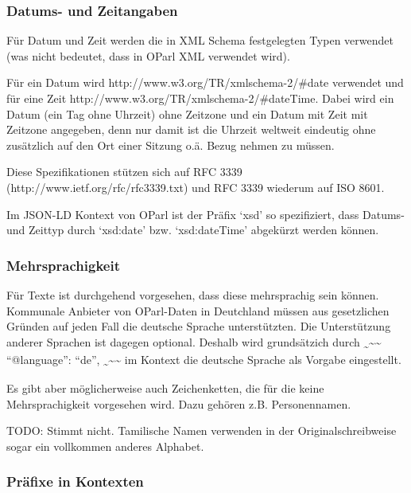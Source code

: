 \documentclass[,a4paper]{article}
\begin{document}
\subsubsection{Datums- und Zeitangaben}\label{datums--und-zeitangaben}

Für Datum und Zeit werden die in XML Schema festgelegten Typen verwendet
(was nicht bedeutet, dass in OParl XML verwendet wird).

Für ein Datum wird http://www.w3.org/TR/xmlschema-2/\#date verwendet und
für eine Zeit http://www.w3.org/TR/xmlschema-2/\#dateTime. Dabei wird
ein Datum (ein Tag ohne Uhrzeit) ohne Zeitzone und ein Datum mit Zeit
mit Zeitzone angegeben, denn nur damit ist die Uhrzeit weltweit
eindeutig ohne zusätzlich auf den Ort einer Sitzung o.ä. Bezug nehmen zu
müssen.

Diese Spezifikationen stützen sich auf RFC 3339
(http://www.ietf.org/rfc/rfc3339.txt) und RFC 3339 wiederum auf ISO
8601.

Im JSON-LD Kontext von OParl ist der Präfix `xsd' so spezifiziert, dass
Datums- und Zeittyp durch `xsd:date' bzw. `xsd:dateTime' abgekürzt
werden können.

\subsubsection{Mehrsprachigkeit}\label{mehrsprachigkeit}

Für Texte ist durchgehend vorgesehen, dass diese mehrsprachig sein
können. Kommunale Anbieter von OParl-Daten in Deutchland müssen aus
gesetzlichen Gründen auf jeden Fall die deutsche Sprache unterstützten.
Die Unterstützung anderer Sprachen ist dagegen optional. Deshalb wird
grundsätzich durch
\textsubscript{\textasciitilde{}}\textasciitilde{}\textasciitilde{}
``@language'': ``de'',
\textsubscript{\textasciitilde{}}\textasciitilde{}\textasciitilde{} im
Kontext die deutsche Sprache als Vorgabe eingestellt.

Es gibt aber möglicherweise auch Zeichenketten, die für die keine
Mehrsprachigkeit vorgesehen wird. Dazu gehören z.B. Personennamen.

TODO: Stimmt nicht. Tamilische Namen verwenden in der
Originalschreibweise sogar ein vollkommen anderes Alphabet.

\subsubsection{Präfixe in Kontexten}\label{pruxe4fixe-in-kontexten}
\end{document}
